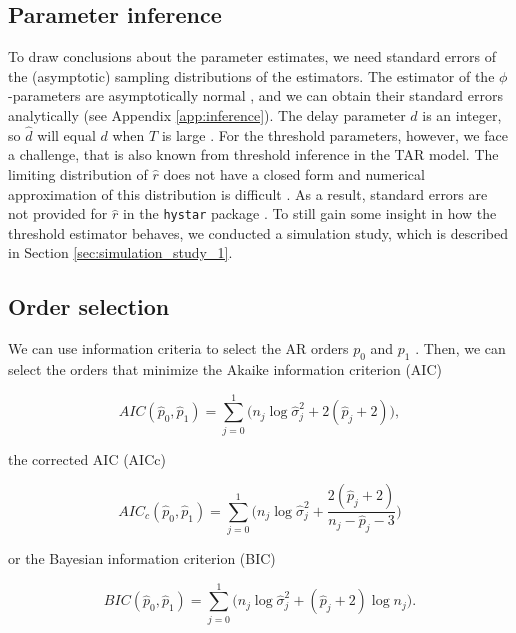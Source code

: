 \documentclass{article}
\begin{document}
\subsection{Parameter inference}
To draw conclusions about the parameter estimates, we need standard errors of the (asymptotic) sampling distributions of the estimators.
The estimator of the $\phi$-parameters are asymptotically normal \citep{bar2}, and we can obtain their standard errors analytically (see Appendix \ref{app:inference}).
The delay parameter $d$ is an integer, so $\hat{d}$ will equal $d$ when $T$ is large \citep{bar2}.
For the threshold parameters, however, we face a challenge, that is also known from threshold inference in the TAR model. 
The limiting distribution of $\hat{r}$ does not have a closed form and numerical approximation of this distribution is difficult \citep{bar2, li_least_2012}.
As a result, standard errors are not provided for $\hat{r}$ in the \texttt{hystar} package \citep[these are also not provided for the \texttt{mTAR}-function to estimate the standard TAR model in the \textsf{R}-package \texttt{NTS}, ][]{R_NTS}. 
To still gain some insight in how the threshold estimator behaves, we conducted a simulation study, which is described in Section \ref{sec:simulation_study_1}.

\subsection{Order selection}
\label{sec:selecting_AR_orders}
We can use information criteria to select the AR orders $p_0$ and $p_1$ \citep[see ][ for an overview of information criteria in the context of threshold models]{information_criteria_tar}. 
Then, we can select the orders that minimize the Akaike information criterion (AIC)

\begin{equation}
AIC(\hat{p}_0, \hat{p}_1) = \sum_{j = 0}^{1} \Big(n_j \log \hat{\sigma}_{j}^2 + 2(\hat{p}_j + 2) \Big),
\end{equation}

the corrected AIC (AICc)

\begin{equation}
AIC_c(\hat{p}_0, \hat{p}_1) = \sum_{j = 0}^{1} \Bigg( n_j \log \hat{\sigma}_{j}^2 + 
\frac{2(\hat{p}_j + 2)}{n_j - \hat{p}_j - 3} \Bigg)
\end{equation}

or the Bayesian information criterion (BIC)

\begin{equation}
BIC(\hat{p}_0, \hat{p}_1) = \sum_{j = 0}^{1} \Big( n_j \log \hat{\sigma}_{j}^2 + (\hat{p}_j + 2)  \log n_j \Big).
\end{equation}
\end{document}
